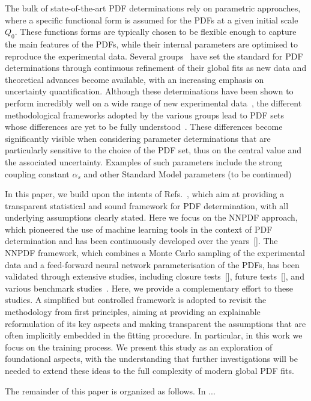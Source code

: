 The bulk of state-of-the-art PDF determinations rely on parametric approaches,
where a specific functional form is assumed for the PDFs at a given initial
scale $Q_0$. These functions forms are typically chosen to be flexible enough to
capture the main features of the PDFs, while their internal parameters are
optimised to reproduce the experimental data. Several
groups~\cite{NNPDF:2021njg,Ablat:2024hbm,Bailey:2020ooq,Alekhin:2017kpj} have
set the standard for PDF determinations through continuous refinement of their
global fits as new data and theoretical advances become available, with an
increasing emphasis on uncertainty quantification. Although these determinations
have been shown to perform incredibly well on a wide range of new experimental
data~\cite{Chiefa:2025loi}, the different methodological frameworks adopted by
the various groups lead to PDF sets whose differences are yet to be fully
understood~\cite{Harland-Lang:2024kvt}. These differences become significantly
visible when considering parameter determinations that are particularly
sensitive to the choice of the PDF set, thus on the central value and the
associated uncertainty. Examples of such parameters include the strong coupling
constant $\alpha_s$ and other Standard Model parameters (\ac{to be continued})

In this paper, we build upon the intents of
Refs.~\cite{DelDebbio:2021whr,Candido:2024hjt}, which aim at providing a
transparent statistical and sound framework for PDF determination, with all
underlying assumptions clearly stated. Here we focus on the NNPDF approach,
which pioneered the use of machine learning tools in the context of PDF
determination and has been continuously developed over the years~[]. The
NNPDF framework, which combines a Monte Carlo sampling of the experimental data
and a feed-forward neural network parameterisation of the PDFs, has been
validated through extensive studies, including closure tests~[], future
tests~[], and various benchmark studies~\cite{Harland-Lang:2024kvt}. Here,
we provide a complementary effort to these studies. A simplified but controlled
framework is adopted to revisit the methodology from first principles, aiming at
providing an explainable reformulation of its key aspects and making transparent
the assumptions that are often implicitly embedded in the fitting procedure. In
particular, in this work we focus on the training process. We present this study
as an exploration of foundational aspects, with the understanding that further
investigations will be needed to extend these ideas to the full complexity of
modern global PDF fits.

The remainder of this paper is organized as follows. In ...
